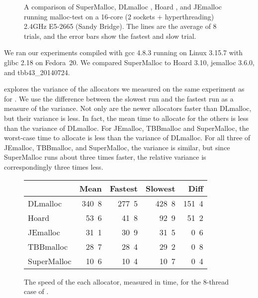 \documentclass{sigplanconf}
\newcommand{\ns}[1]{\unit{#1}\nano\second{}}
\begin{document}
\begin{figure}

\caption{A comparison of SuperMalloc, DLmalloc \cite{Lea96}, Hoard
  \cite{BergerMcBl00}, and JEmalloc~\cite{Evans06} running malloc-test
  on a 16-core (2 sockets + hyperthreading) 2.4GHz E5-2665 (Sandy
  Bridge).  The lines are the average of 8 trials, and the error bars
  show the fastest and slow trial.}
\label{fig:datalock}
\vspace*{-3ex}
\end{figure}

We ran our experiments compiled with gcc 4.8.3 running on Linux 3.15.7
with glibc 2.18 on Fedora~20.  We compared SuperMalloc to Hoard 3.10,
jemalloc 3.6.0, and tbb43\_20140724.

 explores the variance of the allocators we measured
on the same experiment as for .  We use the difference
between the slowest run and the fastest run as a measure of the
variance.  Not only are the newer allocators faster than DLmalloc, but
their variance is less.  In fact, the mean time to allocate for the
others is less than the variance of DLmalloc. For JEmalloc, TBBmalloc
and SuperMalloc, the worst-case time to allocate is less than the
variance of DLmalloc.  For all three of JEmalloc, TBBmalloc, and
SuperMalloc, the variance is similar, but since SuperMalloc runs about
three times faster, the relative variance is correspondingly three
times less.

\begin{figure}
\begin{center}
\begin{tabular}{l@{}rrrr}
            & Mean       & Fastest    & Slowest     & Diff       \\ \hline
DLmalloc    & \ns{340.8} & \ns{277.5} & \ns{428.8}  & \ns{151.4} \\
Hoard       & \ns{ 53.6} & \ns{ 41.8} & \ns{ 92.9}  & \ns{ 51.2} \\
JEmalloc    & \ns{ 31.1} & \ns{ 30.9} & \ns{ 31.5}  & \ns{  0.6} \\
TBBmalloc   & \ns{ 28.7} & \ns{ 28.4} & \ns{ 29.2}  & \ns{  0.8} \\
SuperMalloc & \ns{ 10.6} & \ns{ 10.4} & \ns{ 10.7}  & \ns{  0.4} \\
\end{tabular}
\end{center}
\caption{The speed of the each allocator, measured in time, for the
  8-thread case of .  }
\label{fig:variance}
\end{figure}
\end{document}

